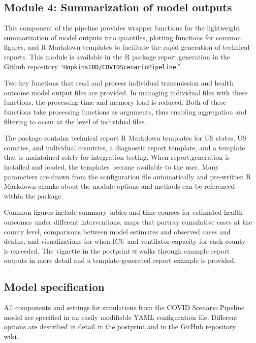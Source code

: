 {\subsection{Module 4: Summarization of model outputs}
This component of the pipeline provides wrapper functions for the lightweight summarization of model outputs into quantiles, plotting functions for common figures, and R Markdown templates to facilitate the rapid generation of technical reports. This module is available in the R package report.generation in the Github repository “\verb|HopkinsIDD/COVIDScenarioPipeline|.”

Two key functions that read and process individual transmission and health outcome model output files are provided. In managing individual files with these functions, the processing time and memory load is reduced. Both of these functions take processing functions as arguments, thus enabling aggregation and filtering to occur at the level of individual files.

The package contains technical report R Markdown templates for US states, US counties, and individual countries, a diagnostic report template, and a template that is maintained solely for integration testing. When report.generation is installed and loaded, the templates become available to the user. Many parameters are drawn from the configuration file automatically and pre-written R Markdown chunks about the module options and methods can be referenced within the package.

Common figures include summary tables and time courses for estimated health outcomes under different interventions, maps that portray cumulative cases at the county level, comparisons between model estimates and observed cases and deaths, and visualizations for when ICU and ventilator capacity for each county is exceeded. The vignette in the postprint \textsc{si} walks through example report outputs in more detail and a template-generated report example is provided.

\subsection{Model specification}
All components and settings for simulations from the COVID  Scenario Pipeline model are specified in an easily modifiable YAML configuration file. Different options are described in detail in the postprint and in the GitHub repository wiki.

}
